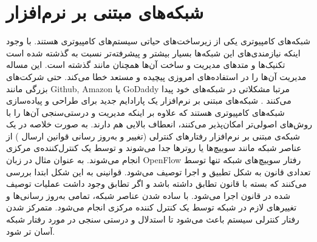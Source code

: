 \section{شبکه‌های مبتنی بر نرم‌افزار}
شبکه‌های کامپیوتری یکی از زیر‌ساخت‌های حیاتی سیستم‌های کامپیوتری هستند.
با وجود اینکه نیازمندی‌های این شبکه‌ها بسیار بیشتر و پیشرفته‌تر نسبت به گذشته شده است تکنیک‌ها و متد‌های مدیریت و ساخت آن‌ها همچنان مانند گذشته است. 
این مساله مدیریت آن‌ها را در استفاده‌های امروزی پیچیده و مستعد خطا می‌کند. 
حتی شرکت‌های بزرگی مانند
Github, Amazon
یا
GoDaddy
مرتبا مشکلاتی در شبکه‌های خود پیدا می‌کنند
\cite{foerster2018survey}
.
شبکه‌های مبتنی بر نرم‌افزار
یک پارادایم جدید برای طراحی و پیاده‌سازی شبکه‌های کامپیوتری هستند که علاوه بر اینکه مدیریت و درستی‌سنجی آن‌ها را با روش‌های اصولی‌تر امکان‌پذیر می‌کنند، انعطاف بالایی هم دارند.
به صورت خلاصه در یک شبکه‌ی مبتنی بر نرم‌افزار رفتار‌های کنترلی 
(تغییر و به‌روز رسانی قوانین ارسال%
)
از عناصر شبکه مانند سوییچ‌ها یا روترها جدا می‌شوند و توسط یک کنترل‌کننده‌ی مرکزی انجام می‌شوند.
به عنوان مثال در زبان 
OpenFlow \cite{mckeown2008openflow}
رفتار سوییچ‌های شبکه تنها توسط تعدادی قانون به شکل 
تطبیق%
و اجرا%
توصیف می‌شود.
قوانینی به این شکل ابتدا بررسی می‌کنند که بسته با قانون تطابق داشته باشد و اگر تطابق وجود داشت عملیات توصیف شده در قانون اجرا می‌شود.
با ساده شدن عناصر شبکه،‌ تمامی به‌روز رسانی‌ها و تغییر‌های لازم در شبکه توسط یک کنترل کننده مرکزی انجام می‌شود.
متمرکز شدن رفتار کنترلی سیستم باعث می‌شود تا استدلال و درستی سنجی در مورد رفتار شبکه آسان تر شود.
